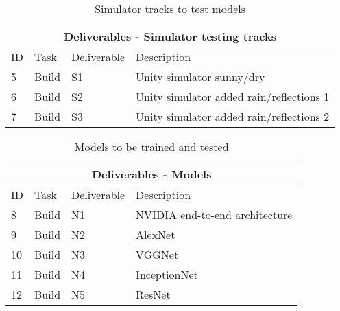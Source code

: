 \begin{table}[]
\begin{center}
\begin{tabular}{|l|l|l|l|}
\hline
\multicolumn{4}{|c|}{Deliverables - Simulator testing tracks} \\ \hline


ID & Task &  Deliverable & Description \\ \hline\hline
5 & Build & S1 &  Unity simulator sunny/dry  \\ \hline
6 & Build & S2 &  Unity simulator added rain/reflections 1 \\ \hline
7 & Build & S3 &  Unity simulator added rain/reflections 2 \\ \hline

\end{tabular}
\end{center}
\caption{Simulator tracks to test models}
\label{Deliverables-Simulators}
\end{table}


\begin{table}[]
\begin{center}
\begin{tabular}{|l|l|l|l|}
\hline
\multicolumn{4}{|c|}{Deliverables - Models} \\ \hline


ID & Task &  Deliverable & Description \\ \hline\hline
8 & Build & N1 &  NVIDIA end-to-end architecture  \\ \hline
9 & Build & N2 &  AlexNet \\ \hline
10 & Build & N3 &  VGGNet \\ \hline
11 & Build & N4 &  InceptionNet \\ \hline
12 & Build & N5 &  ResNet \\ \hline

\end{tabular}
\end{center}
\caption{Models to be trained and tested}
\label{Deliverables-Models}
\end{table}

